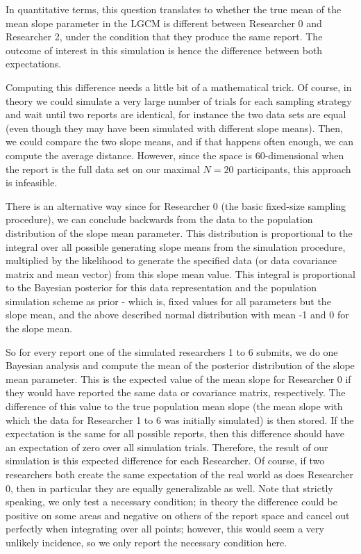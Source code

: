 \documentclass[man]{apa7}\usepackage[]{graphicx}\usepackage[]{xcolor}
\theoremstyle{definition}
\begin{document}
In quantitative terms, this question translates to whether the true mean of the mean slope parameter in the LGCM is different between Researcher 0 and Researcher 2, under the condition that they produce the same report. The outcome of interest in this simulation is hence the difference between both expectations.

Computing this difference needs a little bit of a mathematical trick. Of course, in theory we could simulate a very large number of trials for each sampling strategy and wait until two reports are identical, for instance the two data sets are equal (even though they may have been simulated with different slope means). Then, we could compare the two slope means, and if that happens often enough, we can compute the average distance. However, since the space is 60-dimensional when the report is the full data set on our maximal $N=20$ participants, this approach is infeasible. 

There is an alternative way since for Researcher 0 (the basic fixed-size sampling procedure), we can conclude backwards from the data to the population distribution of the slope mean parameter. This distribution is proportional to the integral over all possible generating slope means from the simulation procedure, multiplied by the likelihood to generate the specified data (or data covariance matrix and mean vector) from this slope mean value. This integral is proportional to the Bayesian posterior for this data representation and the population simulation scheme as prior - which is, fixed values for all parameters but the slope mean, and the above described normal distribution with mean -1 and 0 for the slope mean. 

So for every report one of the simulated researchers 1 to 6 submits, we do one Bayesian analysis and compute the mean of the posterior distribution of the slope mean parameter. This is the expected value of the mean slope for Researcher 0 if they would have reported the same data or covariance matrix, respectively. The difference of this value to the true population mean slope (the mean slope with which the data for Researcher 1 to 6 was initially simulated) is then stored. If the expectation is the same for all possible reports, then this difference should have an expectation of zero over all simulation trials. Therefore, the result of our simulation is this expected difference for each Researcher. Of course, if two researchers both create the same expectation of the real world as does Researcher 0, then in particular they are equally generalizable as well. Note that strictly speaking, we only test a necessary condition; in theory the difference could be positive on some areas and negative on others of the report space and cancel out perfectly when integrating over all points; however, this would seem a very unlikely incidence, so we only report the necessary condition here.
\end{document}
